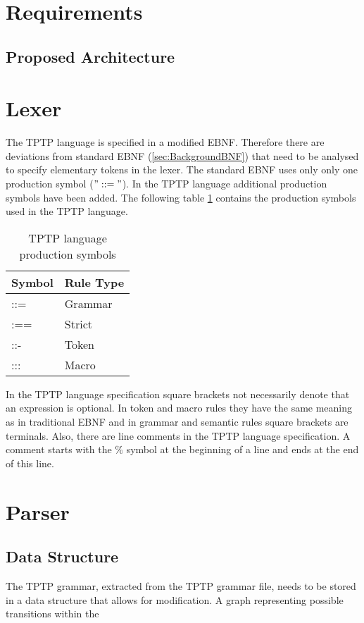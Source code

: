  \section{Requirements}\label{sec:ConceptRequirements}

\subsection{Proposed Architecture}\label{sec:ConceptProposedArchitecture}

\section{Lexer}
The \ac{TPTP} language is specified in a modified \ac{EBNF}.
Therefore there are deviations from standard \ac{EBNF} (\ref{sec:BackgroundBNF}) that need to be analysed to specify elementary tokens in the lexer.
The standard \ac{EBNF} uses only only one production symbol ($"::="$).
In the \ac{TPTP} language additional production symbols have been added.
The following table \ref{tbl:ConceptTPTPProductionSymbols} contains the production symbols used in the \ac{TPTP} language.

\begin{table}[H]
\centering
\renewcommand{\arraystretch}{1}
\caption{\ac{TPTP} language production symbols \cite{VS06}}
\begin{tabular}{ll}
\textbf{Symbol} & \textbf{Rule Type}\\\hline
::= & Grammar\\
:== & Strict\\
::- & Token\\
::: & Macro\\
\end{tabular}
\label{tbl:ConceptTPTPProductionSymbols}
\end{table}

In the \ac{TPTP} language specification square brackets not necessarily denote that an expression is optional.
In token and macro rules they have the same meaning as in traditional  \ac{EBNF} and in grammar and semantic rules square brackets are terminals.
Also, there are line comments in the \ac{TPTP} language specification. A comment starts with the $\%$ symbol at the beginning of a line and ends at the end of this line.


\section{Parser}
\subsection{Data Structure}
The \ac{TPTP} grammar, extracted from the \ac{TPTP} grammar file, needs to be stored in a data structure that allows for modification. A graph representing
possible transitions within the 
